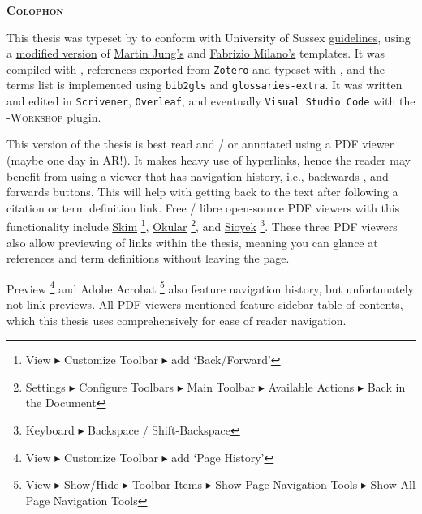 {}

{}\label{sec: reading}
 \begin{flushleft}
	\Huge \textsc{\textbf{Colophon}}
	
\end{flushleft}
\begin{SingleSpace}
\noindent This thesis was typeset by  to conform with University of Sussex \href{https://www.sussex.ac.uk/rsao/examination}{guidelines}, using a \href{https://github.com/sambilbow/Sussex_PhDThesis}{modified version} of \href{https://github.com/Martin-Jung/Sussex_PhDThesis}{Martin Jung's} and \href{https://github.com/fabriziomiano/phd_thesis}{Fabrizio Milano's} templates. It was compiled with , references exported from \verb|Zotero| and typeset with , and the terms list is implemented using \verb|bib2gls| and \verb|glossaries-extra|. It was written and edited in \verb|Scrivener|, \verb|Overleaf|, and eventually \verb|Visual Studio Code| with the -\scriptsize{\textsc{Workshop}} \normalsize plugin.

\noindent This version of the thesis is best read and / or annotated using a PDF viewer (maybe one day in AR!). It makes heavy use of hyperlinks, hence the reader may benefit from using a viewer that has navigation history, i.e., backwards \faArrowCircleLeft\space, and forwards \faArrowCircleRight\space buttons. This will help with getting back to the text after following a citation or term definition link. Free / libre open-source PDF viewers with this functionality include \href{https://sourceforge.net/projects/skim-app/}{Skim} \faApple\space \footnote{View $\blacktriangleright$ Customize Toolbar $\blacktriangleright$ add `Back/Forward'}, \href{https://okular.kde.org/en-gb/}{Okular} \faLinux \space \faWindows \space \footnote{Settings $\blacktriangleright$ Configure Toolbars  $\blacktriangleright$ Main Toolbar $\blacktriangleright$ Available Actions $\blacktriangleright$ Back in the Document}, and \href{https://sioyek.info/}{Sioyek} \faApple \space \faLinux \space \faWindows \space \footnote{Keyboard $\blacktriangleright$ Backspace / Shift-Backspace}. These three PDF viewers also allow previewing of links within the thesis, meaning you can glance at references and term definitions without leaving the page.

\noindent Preview \faApple\space \footnote{View $\blacktriangleright$ Customize Toolbar $\blacktriangleright$ add `Page History'} and Adobe Acrobat \faApple\space \faLinux \space \faWindows \space \footnote{View $\blacktriangleright$  Show/Hide $\blacktriangleright$ Toolbar Items $\blacktriangleright$ Show Page Navigation Tools $\blacktriangleright$ Show All Page Navigation Tools} also feature navigation history, but unfortunately not link previews. All PDF viewers mentioned feature sidebar table of contents, which this thesis uses comprehensively for ease of reader navigation.


\end{SingleSpace}
